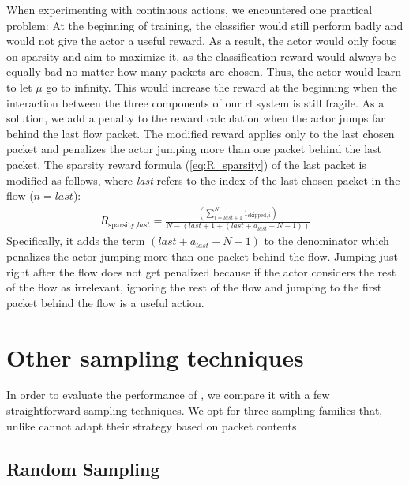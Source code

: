 \documentclass[conference]{IEEEtran}
\begin{document}
When experimenting with continuous actions, we encountered one practical problem: At the beginning of training, the classifier would still perform badly and would not give the actor a useful reward. As a result, the actor would only focus on sparsity and aim to maximize it, as the classification reward would always be equally bad no matter how many packets are chosen. Thus, the actor would learn to let $\mu$ go to infinity. This would increase the reward at the beginning when the interaction between the three components of our \gls{rl} system is still fragile. As a solution, we add a penalty to the reward calculation when the actor jumps far behind the last flow packet. The modified reward applies only to the last chosen packet and penalizes the actor jumping more than one packet behind the last packet. The sparsity reward formula (\autoref{eq:R_sparsity}) of the last packet is modified as follows, where \textit{last} refers to the index of the last chosen packet in the flow ($n=\textit{last}$):
\begin{align}
R_{\text{sparsity},\textit{last}} = \frac{\left(\sum_{i=\textit{last}+1}^{N} 1_{\text{skipped},i}\right)}{N- (\textit{last}+1+\left(\textit{last}+a_{\textit{last}} - N - 1\right))}
\label{eq:R_sparsity_last}
\end{align}
Specifically, it adds the term $\left(\textit{last}+a_{\textit{last}} - N - 1\right)$ to the denominator which penalizes the actor jumping more than one packet behind the flow. Jumping just right after the flow does not get penalized because if the actor considers the rest of the flow as irrelevant, ignoring the rest of the flow and jumping to the first packet behind the flow is a useful action.

\section{Other sampling techniques}
\label{sec:other_sampling_techniques}
In order to evaluate the performance of \ours, we compare it with a few straightforward sampling techniques.
We opt for three sampling families that, unlike \ours{} cannot adapt their strategy based on packet contents. %

\subsection{Random Sampling}
\end{document}
